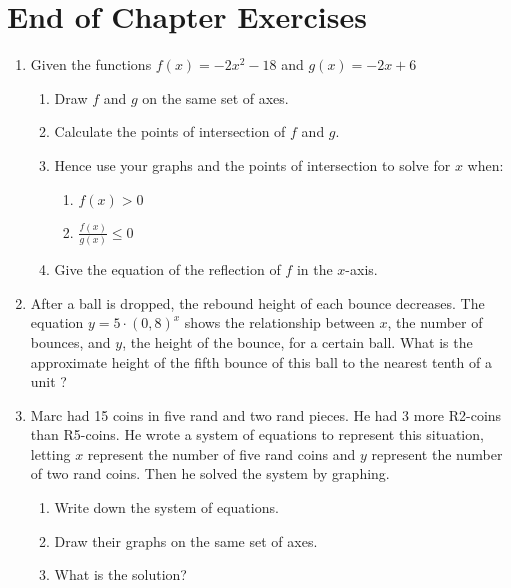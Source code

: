 \documentclass[10pt,a4paper,titlepage,twoside,openright]{report}
\begin{document}
\section{End of Chapter Exercises}
\begin{enumerate}
\item{Given the functions $f(x)=-2x^2-18$ and $g(x)=-2x+6$  
 \begin{enumerate}                            
\item{Draw $f$ and $g$ on the same set of axes.}
\item{Calculate the points of intersection of $f$ and $g$.}                 
\item{Hence use your graphs and the points of intersection to solve for $x$ when:}
\begin{enumerate}
\item{$f(x)>0$}
\item{$\frac{f(x)}{g(x)}\le{0}$}                                 
\end{enumerate}
\item{Give the equation of the reflection of $f$ in the $x$-axis.}                                                    
\end{enumerate}
}
\item{After a ball is dropped, the rebound height of each bounce decreases. The equation $y = 5 \cdot (0,8)^x$ shows the relationship between $x$, the number of bounces, and $y$, the height of the bounce, for a certain ball. What is the approximate height of the fifth bounce of this ball to the nearest tenth of a unit ?}
\item{Marc had 15 coins in five rand and two rand pieces. He had 3 more R2-coins than R5-coins. He wrote a system of equations to represent this situation, letting $x$ represent the number of five rand coins and $y$ represent the number of two rand coins. Then he solved the system by graphing.}
\begin{enumerate}
\item{Write down the system of equations.}
\item{Draw their graphs on the same set of axes.}
\item{What is the solution?}
\end{enumerate}  
\end{enumerate}






\end{document}
